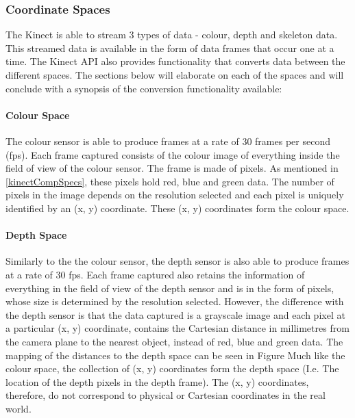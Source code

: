 \subsubsection{Coordinate Spaces}
The Kinect is able to stream 3 types of data - colour, depth and skeleton data. This streamed data is available in the form of data frames that occur one at a time. The Kinect API also provides functionality that converts data between the different spaces. \cite{msdnCoSpaces2017} The sections below will elaborate on each of the spaces and will conclude with a synopsis of the conversion functionality available:

\paragraph{Colour Space}
The colour sensor is able to produce frames at a rate of 30 frames per second (fps). \cite{msdnKinectSpecs2017} Each frame captured consists of the colour image of everything inside the field of view of the colour sensor. The frame is made of pixels. As mentioned in \ref{kinectCompSpecs}, these pixels hold red, blue and green data. The number of pixels in the image depends on the resolution selected and each pixel is uniquely identified by an (x, y) coordinate. These (x, y) coordinates form the colour space. \cite{msdnCoSpaces2017}

\paragraph{Depth Space}
Similarly to the the colour sensor, the depth sensor is also able to produce frames at a rate of 30 fps. \cite{msdnKinectSpecs2017} Each frame captured also retains the information of everything in the field of view of the depth sensor and is in the form of pixels, whose size is determined by the resolution selected.  However, the difference with the depth sensor is that the data captured is a grayscale image and each pixel at a particular (x, y) coordinate, contains the Cartesian distance in millimetres from the camera plane to the nearest object, instead of red, blue and green data. The mapping of the distances to the depth space can be seen in Figure Much like the colour space, the collection of (x, y) coordinates form the depth space (I.e. The location of the depth pixels in the depth frame). The (x, y) coordinates, therefore, do not correspond to physical or Cartesian coordinates in the real world. \cite{msdnCoSpaces2017}

